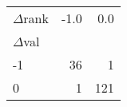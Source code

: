 \begin{tabular}{lrr}
\toprule
$\Delta$rank &  -1.0 &   0.0 \\
$\Delta$val &       &       \\
\midrule
-1        &    36 &     1 \\
 0        &     1 &   121 \\
\bottomrule
\end{tabular}
